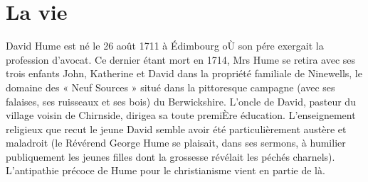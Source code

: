 
\chapter{La vie}

David Hume est né le 26 août 1711 à Édimbourg
oÙ son pére exergait la profession d’avocat. Ce
dernier étant mort en 1714, Mrs Hume se retira
avec ses trois enfants John, Katherine et David
dans la propriété familiale de Ninewells, le domaine
des « Neuf Sources » situé dans la pittoresque campagne
(avec ses falaises, ses ruisseaux et ses bois)
du Berwickshire. L’oncle de David, pasteur du
village voisin de Chirnside, dirigea sa toute premiÈre
éducation. L’enseignement religieux que recut le
jeune David semble avoir été particulièrement
austère et maladroit (le Révérend George Hume
se plaisait, dans ses sermons, à humilier publiquement
les jeunes filles dont la grossesse révélait les
péchés charnels). L’antipathie précoce de Hume
pour le christianisme vient en partie de là.

